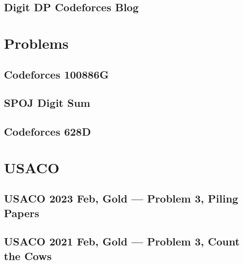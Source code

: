 \documentclass[11pt]{scrartcl}
\begin{document}
\subsection{Digit DP Codeforces Blog}

\section{Problems}
\subsection{Codeforces 100886G}

\subsection{SPOJ Digit Sum}

\subsection{Codeforces 628D}

\section{USACO}
\subsection{USACO 2023 Feb, Gold --- Problem 3, Piling Papers}

\subsection{USACO 2021 Feb, Gold --- Problem 3, Count the Cows}
\end{document}
